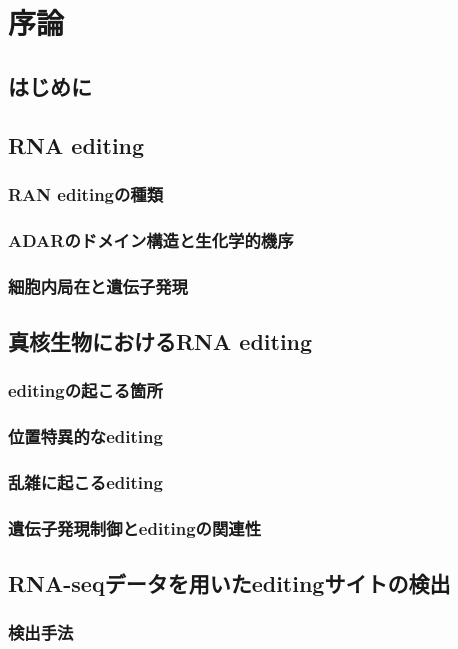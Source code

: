 \chapter{序論}
\section{はじめに}

\section{RNA editing}
\subsection{RAN editingの種類}
\subsection{ADARのドメイン構造と生化学的機序}
\subsection{細胞内局在と遺伝子発現}

\section{真核生物におけるRNA editing}
\subsection{editingの起こる箇所}
\subsection{位置特異的なediting}
\subsection{乱雑に起こるediting}
\subsection{遺伝子発現制御とeditingの関連性}

\section{RNA-seqデータを用いたeditingサイトの検出}
\subsection{検出手法}
